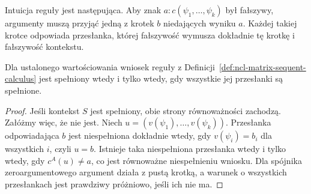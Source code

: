 Intuicja reguły jest następująca. Aby znak
$a:c(\psi_1,\ldots,\psi_k)$ był fałszywy,
argumenty muszą przyjąć jedną z krotek $b$
niedających wyniku $a$. Każdej takiej krotce
odpowiada przesłanka, której fałszywość wymusza
dokładnie tę krotkę i fałszywość kontekstu.

\begin{lemat}
\label{lem:ncl-sequent-invertibility}
Dla ustalonego wartościowania wniosek reguły
z Definicji~\ref{def:ncl-matrix-sequent-calculus}
jest spełniony wtedy i tylko wtedy, gdy wszystkie
jej przesłanki są spełnione.
\end{lemat}
\begin{proof}
Jeśli kontekst $S$ jest spełniony, obie strony
równoważności zachodzą. Załóżmy więc, że nie jest.
Niech $u=(v(\psi_1),\ldots,v(\psi_k))$.
Przesłanka odpowiadająca $b$ jest niespełniona
dokładnie wtedy, gdy $v(\psi_i)=b_i$ dla wszystkich
$i$, czyli $u=b$. Istnieje taka niespełniona
przesłanka wtedy i tylko wtedy, gdy $c^A(u)\ne a$,
co jest równoważne niespełnieniu wniosku.
Dla spójnika zeroargumentowego argument działa
z pustą krotką, a warunek o wszystkich przesłankach
jest prawdziwy próżniowo, jeśli ich nie ma.
\end{proof}

